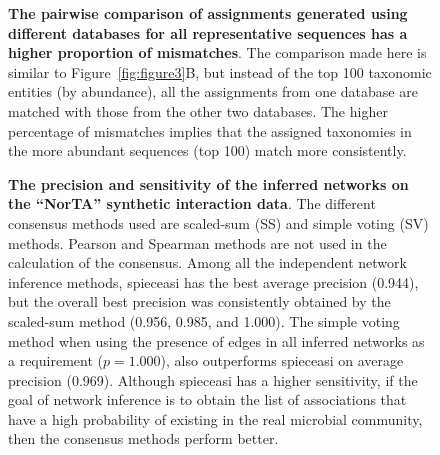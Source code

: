     \begin{figure}[H]
      \centering
        \caption{
          \textbf{The pairwise comparison of assignments generated using different databases for all representative sequences has a higher proportion of mismatches}.
          The comparison made here is similar to Figure~\ref{fig:figure3}B, but instead of the top 100 taxonomic entities (by abundance), all the assignments from one database are matched with those from the other two databases.
          The higher percentage of mismatches implies that the assigned taxonomies in the more abundant sequences (top 100) match more consistently.
        }
      \label{fig:figure_s4}
    \end{figure}

  \begin{figure}[H]
    \centering
      \caption{
        \textbf{The precision and sensitivity of the inferred networks on the ``NorTA'' synthetic interaction data}.
        The different consensus methods used are scaled-sum (SS) and simple voting (SV) methods.
        Pearson and Spearman methods are not used in the calculation of the consensus.
        Among all the independent network inference methods, \acs{spieceasi} has the best average precision (0.944), but the overall best precision was consistently obtained by the scaled-sum method (0.956, 0.985, and 1.000).
        The simple voting method when using the presence of edges in all inferred networks as a requirement ($p = 1.000$), also outperforms \acs{spieceasi} on average precision (0.969).
        Although \acs{spieceasi} has a higher sensitivity, if the goal of network inference is to obtain the list of associations that have a high probability of existing in the real microbial community, then the consensus methods perform better.
      }
    \label{fig:figure_s5}
  \end{figure}

